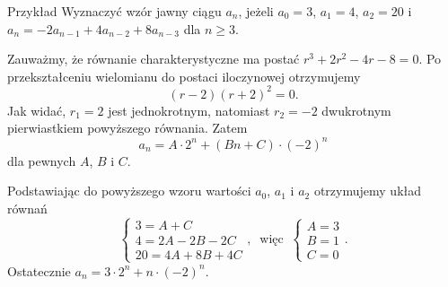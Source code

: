 \documentclass[a4paper,10pt]{beamer}
\begin{document}
\begin{frame}
	
	\begin{exampleblock}{Przykład}
		Wyznaczyć wzór jawny ciągu $a_n$, jeżeli $a_0=3$, $a_1=4$, $a_2=20$ i~$a_n=-2a_{n-1}+4a_{n-2}+8a_{n-3}$ dla $n\geq3$.
		
		Zauważmy, że równanie charakterystyczne ma postać $r^3+2r^2-4r-8=0.$ Po przekształceniu wielomianu do postaci iloczynowej otrzymujemy 
		$$(r-2)(r+2)^2=0.$$
		Jak widać, $r_1=2$ jest jednokrotnym, natomiast $r_2=-2$ dwukrotnym pierwiastkiem powyższego równania. Zatem
		$$a_n=A\cdot2^n+(Bn+C)\cdot (-2)^n$$ dla pewnych $A$, $B$ i $C$.
		
		Podstawiając do powyższego wzoru wartości $a_0$, $a_1$ i $a_2$ otrzymujemy układ równań
		$$\left\{\begin{array}{l}3=A+C\\4=2A-2B-2C\\20=4A+8B+4C\end{array}\right.,\ \mbox{ więc }\ \left\{\begin{array}{l}A=3\\B=1\\C=0\end{array}\right. .$$ Ostatecznie $a_n=3\cdot2^n+n\cdot(-2)^n$.
	\end{exampleblock}
	
\end{frame}
\end{document}
